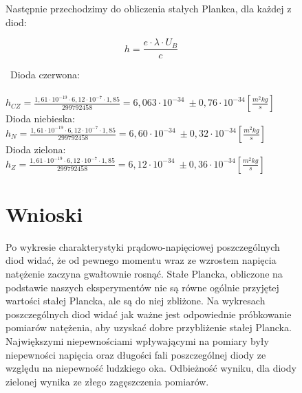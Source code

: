 \documentclass{article}
\begin{document}
\begin{figure}[h!]
    \begin{center}
        Następnie przechodzimy do obliczenia stałych Plankca, dla każdej z diod:
    \end{center}{}
    $$
    h=\frac{e\cdot \lambda \cdot U_{B}}{c}
    $$
    

    \par \ Dioda czerwona:\\ \\
    \vspace{1ex}
    $h_{CZ}=\frac{1,61\cdot 10^{−19}\cdot 6,12\cdot10^{-7} \cdot1,85}{299792458}=6,063\cdot10^{-34} \ \pm0,76\cdot10^{-34} \left[\frac{m^2kg}{s}\right]$\\
    \vspace{2.5ex}
    Dioda niebieska:\\
    \vspace{2ex}
    $h_{N}=\frac{1,61\cdot 10^{−19}\cdot 6,12\cdot10^{-7} \cdot1,85}{299792458}=6,60\cdot10^{-34} \ \pm0,32\cdot10^{-34} \left[\frac{m^2kg}{s}\right]$\\
    \vspace{2ex}
    Dioda zielona:\\
    \vspace{2ex}
    $h_{Z}=\frac{1,61\cdot 10^{−19}\cdot 6,12\cdot10^{-7} \cdot1,85}{299792458}=6,12\cdot10^{-34} \ \pm0,36\cdot10^{-34} \left[\frac{m^2kg}{s}\right]$\\
        
\end{figure}




\begin{figure}[h!]
\section{Wnioski}
\par Po wykresie charakterystyki prądowo-napięciowej poszczególnych diod widać, że od pewnego momentu wraz ze wzrostem napięcia natężenie zaczyna gwałtownie rosnąć. Stałe Plancka, obliczone na podstawie naszych eksperymentów nie są równe ogólnie przyjętej wartości stałej Plancka, ale są do niej zbliżone. Na wykresach poszczególnych diod widać jak ważne jest odpowiednie próbkowanie pomiarów natężenia, aby uzyskać dobre przybliżenie stałej Plancka. Największymi niepewnościami wpływającymi na pomiary były niepewności napięcia oraz długości fali poszczególnej diody ze względu na niepewność ludzkiego oka. Odbieżność wyniku, dla diody zielonej wynika ze złego zagęszczenia pomiarów.
\end{figure}
\end{document}
